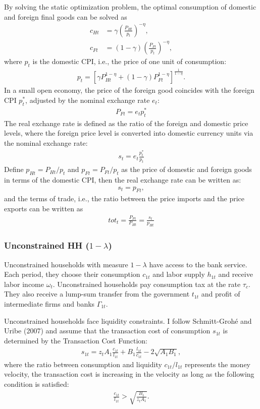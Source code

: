 \documentclass[12pt]{article}
\begin{document}
By solving the static optimization problem, the optimal consumption of domestic and foreign final goods can be solved as 
\begin{align*}
c_{Ht} &= \gamma(\frac{P_{Ht}}{p_t})^{-\eta}, \\
c_{Ft} &= (1-\gamma)(\frac{P_{Ft}}{p_t})^{-\eta}, 
\end{align*}
where $p_t$ is the domestic CPI, i.e., the price of one unit of consumption: 
\begin{align*}
p_t = [\gamma P_{Ht}^{1-\eta}+(1-\gamma)P_{Ft}^{1-\eta}]^{\frac{1}{1-\eta}}.
\end{align*}
In a small open economy, the price of the foreign good coincides with the foreign CPI $p_t^*$, adjusted by the nominal exchange rate $e_t$:
\begin{align*}
P_{Ft} = e_tp_t^*
\end{align*}
The real exchange rate is defined as the ratio of the foreign and domestic price levels, where the foreign price level is converted into domestic currency units via the nominal exchange rate: 
\begin{align*}
s_t = e_t \frac{p_t^*}{p_t}
\end{align*}
Define $p_{Ht} = P_{Ht}/p_t$ and  $p_{Ft} = P_{Ft}/p_t$ as the price of domestic and foreign goods in terms of the domestic CPI, then the real exchange rate can be written as: 
\begin{align*}
s_t = p_{Ft}, 
\end{align*}
and the terms of trade, i.e., the ratio between the price imports and the price exports can be written as 
\begin{align*}
tot_t = \frac{P_{Ft}}{P_{Ht}} = \frac{s_t}{p_{Ht}}
\end{align*}

\subsubsection*{Unconstrained HH ($1-\lambda$)} 
Unconstrained households with measure $1-\lambda$ have access to the bank service. Each period, they choose their consumption $c_{1t}$ and labor supply $h_{1t}$ and receive labor income $\omega_t$. Unconstrained households pay consumption tax at the rate $\tau_c$. They also receive a lump-sum transfer from the government $t_{1t}$ and profit of intermediate firms and banks $\Gamma_{1t}$.

Unconstrained households face liquidity constraints. I follow Schmitt-Groh{\'e} and Uribe (2007) and assume that the transaction cost of consumption $s_{1t}$ is determined by the Transaction Cost Function:
\begin{align*}
s_{1t} = z_tA_1\frac{c_{1t}}{l_{1t}}+B_1\frac{l_{1t}}{c_{1t}}-2\sqrt{A_1B_1},
\end{align*}
where the ratio between consumption and liquidity $c_{1t}/l_{1t}$ represents the money velocity, the transaction cost is increasing in the velocity as long as the following condition is satisfied:  
\begin{align*}
\frac{c_{1t}}{l_{1t}}>\sqrt{\frac{B_1}{z_tA_1}}.
\end{align*} 
\end{document}
